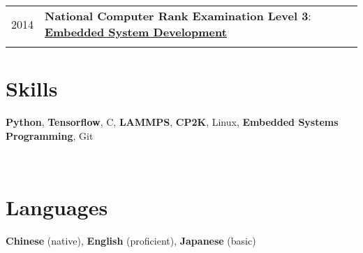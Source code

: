 \documentclass[a4paper,10pt]{article} %
\begin{document}
\begin{tabular}{r|l}
2014					& \textbf{National Computer Rank Examination Level 3}: \href{https://nbviewer.org/github/HuangJiaLian/DataBase0/blob/bffb5248aa974d5a5a0b1b5c9130951158f4f460/uPic/2021_11_26_11_6.png}{\textbf{Embedded System Development}}\\
\multicolumn{2}{c}{} \\	%

\end{tabular}

\section{Skills}
\begin{small}
\textbf{Python}, \textbf{Tensorflow}, C, \textbf{LAMMPS}, \textbf{CP2K}, Linux,  \textbf{Embedded Systems Programming}, Git
\end{small}
\\

\section{Languages}
\textbf{Chinese} (native),  \textbf{English} (proficient),  \textbf{Japanese} (basic)
\\
\end{document}
